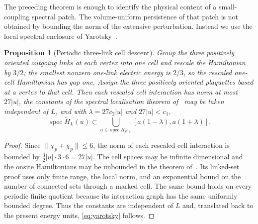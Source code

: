 \documentclass[11pt]{article}
\theoremstyle{plain}
\newtheorem{proposition}[theorem]{Proposition}
\theoremstyle{definition}
\theoremstyle{remark}
\begin{document}
The preceding theorem is enough to identify the physical content of a
small-coupling spectral patch. The volume-uniform persistence of that patch is
not obtained by bounding the norm of the extensive perturbation. Instead we
use the local spectral enclosure of Yarotsky~\cite{Yarotsky2004}.

\begin{proposition}[Periodic three-link cell descent]
\label{prop:periodic-yarotsky-descent}
Group the three positively oriented outgoing links at each vertex into one
cell and rescale the Hamiltonian by $3/2$; the smallest nonzero one-link
electric energy is $2/3$, so the rescaled one-cell Hamiltonian has gap one.
Assign the three positively oriented plaquettes based at a vertex to that
cell. Then each rescaled cell interaction has norm at most $27|u|$, the
constants of the spectral localisation theorem of~\cite{Yarotsky2004} may be
taken independent of $L$, and with $\lambda=27c_2|u|$ and $27|u|<c_1$,
\begin{equation}\label{eq:yarotsky}
  \operatorname{spec}\widetilde H_L(u)\subset
  \bigcup_{a\in\operatorname{spec}H_{E,L}}[a(1-\lambda),a(1+\lambda)].
\end{equation}
\end{proposition}

\begin{proof}
Since $\|\chi_p+\bar\chi_p\|\le6$, the norm of each rescaled cell interaction
is bounded by $\tfrac32|u|\cdot3\cdot6=27|u|$. The cell spaces may be infinite
dimensional and the onsite Hamiltonians may be unbounded in the theorem
of~\cite{Yarotsky2004}. Its linked-set proof uses only finite range, the local
norm, and an exponential bound on the number of connected sets through a
marked cell. The same bound holds on every periodic finite quotient because
its interaction graph has the same uniformly bounded degree. Thus the
constants are independent of $L$ and, translated back to the present energy
units, \eqref{eq:yarotsky} follows.
\end{proof}
\end{document}
